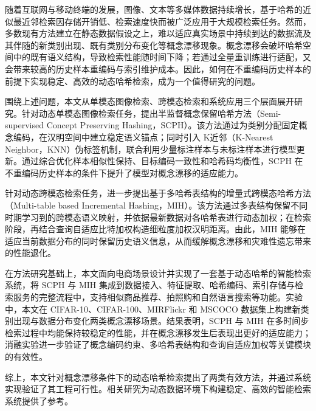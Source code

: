 \begin{cabstract}
随着互联网与移动终端的发展，图像、文本等多媒体数据持续增长，基于哈希的近似最近邻检索因存储开销低、检索速度快而被广泛应用于大规模检索任务。然而，多数现有方法建立在静态数据假设之上，难以适应真实场景中持续到达的数据流及其伴随的新类别出现、既有类别分布变化等概念漂移现象。概念漂移会破坏哈希空间中的既有语义结构，导致检索性能随时间下降；若通过全量重训练进行适配，又会带来较高的历史样本重编码与索引维护成本。因此，如何在不重编码历史样本的前提下实现稳定、高效的动态哈希检索，成为一个值得研究的问题。

围绕上述问题，本文从单模态图像检索、跨模态检索和系统应用三个层面展开研究。针对动态单模态图像检索任务，提出半监督概念保留哈希方法（Semi-supervised Concept Preserving Hashing，SCPH）。该方法通过为类别分配固定概念编码，在汉明空间中建立稳定语义锚点；同时引入 K近邻（K-Nearest Neighbor，KNN）伪标签机制，联合利用少量标注样本与未标注样本进行模型更新。通过综合优化样本相似性保持、目标编码一致性和哈希码均衡性，SCPH 在不重编码历史样本的条件下提升了模型对概念漂移的适应能力。

针对动态跨模态检索任务，进一步提出基于多哈希表结构的增量式跨模态哈希方法（Multi-table based Incremental Hashing，MIH）。该方法通过多表结构保留不同时期学习到的跨模态语义映射，并依据最新数据对各哈希表进行动态加权；在检索阶段，再结合查询自适应比特加权构造细粒度加权汉明距离。由此，MIH 能够在适应当前数据分布的同时保留历史语义信息，从而缓解概念漂移和灾难性遗忘带来的性能退化。

在方法研究基础上，本文面向电商场景设计并实现了一套基于动态哈希的智能检索系统，将 SCPH 与 MIH 集成到数据接入、特征提取、哈希编码、索引存储与检索服务的完整流程中，支持相似商品推荐、拍照购和自然语言搜索等功能。实验中，本文在 CIFAR-10、CIFAR-100、MIRFlickr 和 MSCOCO 数据集上构建新类别出现与数据分布变化两类概念漂移场景。结果表明，SCPH 与 MIH 在多时间步检索过程中均能保持较稳定的性能，并在概念漂移发生后表现出更好的适应能力；消融实验进一步验证了概念编码约束、多哈希表结构和查询自适应加权等关键模块的有效性。

综上，本文针对概念漂移条件下的动态哈希检索提出了两类有效方法，并通过系统实现验证了其工程可行性。相关研究为动态数据环境下构建稳定、高效的智能检索系统提供了参考。

\end{cabstract}
